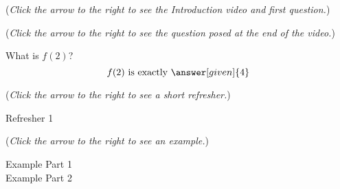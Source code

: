 \documentclass{ximera}
\begin{document}
\begin{question}

\begin{flushright}
{\color{blue}(\emph{Click the arrow to the right
to see the Introduction video and first question.})}
\end{flushright}

\begin{center}
\begin{expandable}
{\color{blue}(\emph{Click the arrow to the right to see the question
posed at the end of the video.})}

\begin{expandable}

What is $f(2)$?\\

\[
f(2) \text{ is exactly }\answer[given]{4}
\]

\begin{flushright}
{\color{blue}(\emph{Click the arrow to the right to see a short refresher.})}
\end{flushright}
\begin{expandable}
Refresher 1
\end{expandable}
\begin{flushright}
{\color{blue}(\emph{Click the arrow to the right to see an example.})}
\end{flushright}
\begin{expandable}
Example Part 1
\\

Example Part 2
\end{expandable}
\end{expandable}
\end{expandable}
\end{center}
\end{question}
\end{document}

